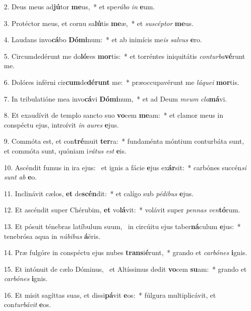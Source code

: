 2. Deus meus ad\textbf{jú}tor \textbf{me}us,~*  et spe\textit{rá}\textit{bo} \textit{in} \textbf{e}um.\

3. Protéctor meus, et cornu sa\textbf{lú}tis \textbf{me}æ,~*  et \textit{su}\textit{scép}\textit{tor} \textbf{me}us.\

4. Laudans invo\textbf{cá}bo \textbf{Dó}\textbf{mi}num:~*  et ab inimícis me\textit{is} \textit{sal}\textit{vus} \textbf{e}ro.\

5. Circumdedérunt me do\textbf{ló}res \textbf{mor}tis:~*  et torréntes iniquitátis \textit{con}\textit{tur}\textit{ba}\textbf{vé}runt me.\

6. Dolóres inférni cir\textbf{cum}de\textbf{dé}\textbf{runt} me:~*  præoccupavérunt me \textit{lá}\textit{que}\textit{i} \textbf{mor}tis.\

7. In tribulatióne mea invo\textbf{cá}vi \textbf{Dó}\textbf{mi}num,~*  et ad Deum \textit{me}\textit{um} \textit{cla}\textbf{má}vi.\

8. Et exaudívit de templo sancto suo \textbf{vo}cem \textbf{me}am:~*  et clamor meus in conspéctu ejus, introívit \textit{in} \textit{au}\textit{res} \textbf{e}jus.\

9. Commóta est, et con\textbf{tré}muit \textbf{ter}ra:~*  fundaménta móntium conturbáta sunt, et commóta sunt, quóniam i\textit{rá}\textit{tus} \textit{est} \textbf{e}is.\

10. Ascéndit fumus in ira ejus: \dag\  et ignis a fácie \textbf{e}jus ex\textbf{ár}sit:~*  carbónes succén\textit{si} \textit{sunt} \textit{ab} \textbf{e}o.\

11. Inclinávit cælos, \textbf{et} de\textbf{scén}dit:~*  et calígo sub \textit{pé}\textit{di}\textit{bus} \textbf{e}jus.\

12. Et ascéndit super Chérubim, \textbf{et} vo\textbf{lá}vit:~*  volávit super \textit{pen}\textit{nas} \textit{ven}\textbf{tó}rum.\

13. Et pósuit ténebras latíbulum suum, \dag\  in circúitu ejus taber\textbf{ná}culum \textbf{e}jus:~*  tenebrósa aqua in \textit{nú}\textit{bi}\textit{bus} \textbf{á}ëris.\

14. Præ fulgóre in conspéctu ejus nubes \textbf{trans}i\textbf{é}runt,~*  grando et \textit{car}\textit{bó}\textit{nes} \textbf{i}gnis.\

15. Et intónuit de cælo Dóminus, \dag\  et Altíssimus dedit \textbf{vo}cem \textbf{su}am:~*  grando et \textit{car}\textit{bó}\textit{nes} \textbf{i}gnis.\

16. Et misit sagíttas suas, et dissi\textbf{pá}vit \textbf{e}os:~*  fúlgura multiplicávit, et con\textit{tur}\textit{bá}\textit{vit} \textbf{e}os.\

